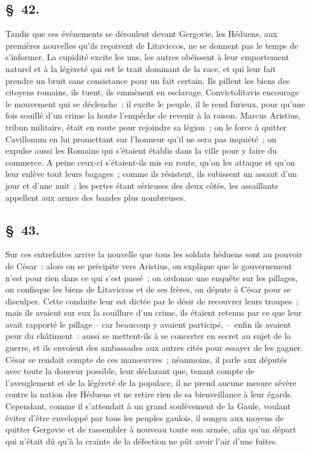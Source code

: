 \documentclass[french,twoside]{book} %
\begin{document}
\subsection[{§ 42.}]{ \textsc{§ 42.} }
\noindent Tandis que ces événements se déroulent devant Gergovie, les Héduens, aux premières nouvelles qu’ils reçoivent de Litaviccos, ne se donnent pas le temps de s’informer. La cupidité excite les uns, les autres obéissent à leur emportement naturel et à la légèreté qui est le trait dominant de la race, et qui leur fait prendre un bruit sans consistance pour un fait certain. Ils pillent les biens des citoyens romains, ils tuent, ils emmènent en esclavage. Convictolitavis encourage le mouvement qui se déclenche : il excite le peuple, il le rend furieux, pour qu’une fois souillé d’un crime la honte l’empêche de revenir à la raison. Marcus Aristius, tribun militaire, était en route pour rejoindre sa légion ; on le force à quitter Cavillonum en lui promettant sur l’honneur qu’il ne sera pas inquiété ; on expulse aussi les Romains qui s’étaient établis dans la ville pour y faire du commerce. A peine ceux-ci s’étaient-ils mis en route, qu’on les attaque et qu’on leur enlève tout leurs bagages ; comme ils résistent, ils subissent un assaut d’un jour et d’une nuit ; les pertes étant sérieuses des deux côtés, les assaillants appellent aux armes des bandes plus nombreuses.
\subsection[{§ 43.}]{ \textsc{§ 43.} }
\noindent Sur ces entrefaites arrive la nouvelle que tous les soldats héduens sont au pouvoir de César : alors on se précipite vers Aristius, on explique que le gouvernement n’est pour rien dans ce qui s’est passé ; on ordonne une enquête sur les pillages, on confisque les biens de Litaviccos et de ses frères, on députe à César pour se disculper. Cette conduite leur est dictée par le désir de recouvrer leurs troupes ; mais ils avaient sur eux la souillure d’un crime, ils étaient retenus par ce que leur avait rapporté le pillage – car beaucoup y avaient participé, – enfin ils avaient peur du châtiment : aussi se mettent-ils à se concerter en secret au sujet de la guerre, et ils envoient des ambassades aux autres cités pour essayer de les gagner. César se rendait compte de ces manœuvres ; néanmoins, il parle aux députés avec toute la douceur possible, leur déclarant que, tenant compte de l’aveuglement et de la légèreté de la populace, il ne prend aucune mesure sévère contre la nation des Héduens et ne retire rien de sa bienveillance à leur égards. Cependant, comme il s’attendait à un grand soulèvement de la Gaule, voulant éviter d’être enveloppé par tous les peuples gaulois, il songea aux moyens de quitter Gergovie et de rassembler à nouveau toute son armée, afin qu’un départ qui n’était dû qu’à la crainte de la défection ne pût avoir l’air d’une fuites.
\end{document}
